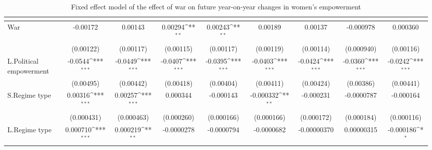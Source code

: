 \begin{table}[htbp]\centering
\def\sym#1{\ifmmode^{#1}\else\(^{#1}\)\fi}
\caption{Fixed effect model of the effect of war on future year-on-year changes in women's empowerment\label{fyearonyearpolempower}}
\begin{tabular}{l*{8}{c}}
\hline\hline
                    &&&&&&&&\\
\hline
War                 &    -0.00172         &     0.00143         &     0.00294\sym{**} &     0.00243\sym{**} &     0.00189         &     0.00137         &   -0.000978         &    0.000360         \\
                    &   (0.00122)         &   (0.00117)         &   (0.00115)         &   (0.00117)         &   (0.00119)         &   (0.00114)         &  (0.000940)         &   (0.00116)         \\
[1em]
L.Political empowerment&     -0.0544\sym{***}&     -0.0449\sym{***}&     -0.0407\sym{***}&     -0.0395\sym{***}&     -0.0403\sym{***}&     -0.0424\sym{***}&     -0.0360\sym{***}&     -0.0242\sym{***}\\
                    &   (0.00495)         &   (0.00442)         &   (0.00418)         &   (0.00404)         &   (0.00411)         &   (0.00424)         &   (0.00386)         &   (0.00441)         \\
[1em]
S.Regime type       &     0.00316\sym{***}&     0.00257\sym{***}&    0.000344         &   -0.000143         &   -0.000332\sym{**} &   -0.000231         &  -0.0000787         &   -0.000164         \\
                    &  (0.000431)         &  (0.000463)         &  (0.000260)         &  (0.000166)         &  (0.000166)         &  (0.000172)         &  (0.000184)         &  (0.000116)         \\
[1em]
L.Regime type       &    0.000710\sym{***}&    0.000219\sym{**} &  -0.0000278         &  -0.0000794         &  -0.0000682         & -0.00000370         &  0.00000315         &   -0.000186\sym{*}  \\

\end{tabular}
\end{table}
